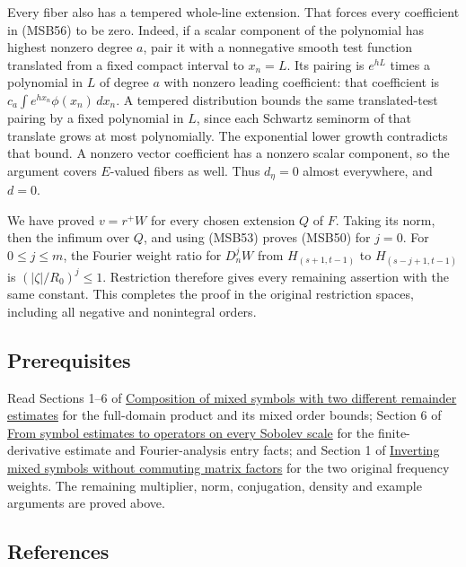 \documentclass[
  11pt,
]{article}
\makeatletter
\let\ReaderOriginalAnchorStart\hyper@anchorstart
\let\ReaderOriginalAnchorEnd\hyper@anchorend
\let\ReaderPendingAliases\@empty
\def\ReaderArmAliases#1{\gdef\ReaderPendingAliases{#1}}
\def\hyper@anchorstart#1{\ReaderIfNativeAnchorTF{#1}{\ReaderPendingAliases\global\let\ReaderPendingAliases\@empty}{}\ReaderOriginalAnchorStart{#1}}
\makeatother
\begin{document}
Every fiber also has a tempered whole-line extension. That forces every
coefficient in (MSB56) to be zero. Indeed, if a scalar component of the
polynomial has highest nonzero degree \(a\), pair it with a nonnegative
smooth test function translated from a fixed compact interval to
\(x_n=L\). Its pairing is \(e^{hL}\) times a polynomial in \(L\) of
degree \(a\) with nonzero leading coefficient: that coefficient is
\(c_a\int e^{hx_n}\phi(x_n)\,dx_n\). A tempered distribution bounds the
same translated-test pairing by a fixed polynomial in \(L\), since each
Schwartz seminorm of that translate grows at most polynomially. The
exponential lower growth contradicts that bound. A nonzero vector
coefficient has a nonzero scalar component, so the argument covers
\(E\)-valued fibers as well. Thus \(d_\eta=0\) almost everywhere, and
\(d=0\).

We have proved \(v=r^+W\) for every chosen extension \(Q\) of \(F\).
Taking its norm, then the infimum over \(Q\), and using (MSB53) proves
(MSB50) for \(j=0\). For \(0\leq j\leq m\), the Fourier weight ratio for
\(D_n^jW\) from \(H_{(s+1,t-1)}\) to \(H_{(s-j+1,t-1)}\) is
\((|\zeta|/R_0)^j\leq1\). Restriction therefore gives every remaining
assertion with the same constant. This completes the proof in the
original restriction spaces, including all negative and nonintegral
orders.

\ReaderArmAliases{\ReaderOriginalAnchorStart{prerequisites-and-mathematical-antecedent}\ReaderOriginalAnchorEnd\begingroup\expandafter\def\csname @currentHref\endcsname{prerequisites-and-mathematical-antecedent}\label{prerequisites-and-mathematical-antecedent}\endgroup\ReaderOriginalAnchorStart{prerequisites}\ReaderOriginalAnchorEnd}
\subsection{Prerequisites}\label{prerequisites}

Read Sections 1--6 of \href{mixed-symbol-composition.pdf}{Composition of
mixed symbols with two different remainder estimates} for the
full-domain product and its mixed order bounds; Section 6 of
\href{euclidean-symbol-calculus.pdf}{From symbol estimates to operators
on every Sobolev scale} for the finite-derivative estimate and
Fourier-analysis entry facts; and Section 1 of
\href{mixed-symbol-inversion.pdf}{Inverting mixed symbols without
commuting matrix factors} for the two original frequency weights. The
remaining multiplier, norm, conjugation, density and example arguments
are proved above.

\subsection{References}\label{references}
\end{document}
